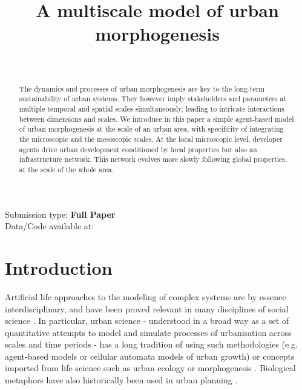 \documentclass[letterpaper]{article}
\title{A multiscale model of urban morphogenesis}
\author{%
\mbox{}\\
}
\begin{document}
\maketitle

\begin{abstract}
The dynamics and processes of urban morphogenesis are key to the long-term sustainability of urban systems. They however imply stakeholders and parameters at multiple temporal and spatial scales simultaneously, leading to intricate interactions between dimensions and scales. We introduce in this paper a simple agent-based model of urban morphogenesis at the scale of an urban area, with specificity of integrating the microscopic and the mesoscopic scales. At the local microscopic level, developer agents drive urban development conditioned by local properties but also an infrastructure network. This network evolves more slowly following global properties, at the scale of the whole area.
\end{abstract}

Submission type: \textbf{Full Paper}\\

Data/Code available at: \url{}



\section{Introduction}

Artificial life approaches to the modeling of complex systems are by essence interdisciplinary, and have been proved relevant in many disciplines of social science \citep{youn2018scaling}. In particular, urban science - understood in a broad way as a set of quantitative attempts to model and simulate processes of urbanisation across scales and time periods \citep{batty2013new} - has a long tradition of using such methodologies (e.g. agent-based models or cellular automata models of urban growth) or concepts imported from life science such as urban ecology or morphogenesis \citep{raimbault2020cities}. Biological metaphors have also historically been used in urban planning \citep{batty2009centenary}.
\end{document}
